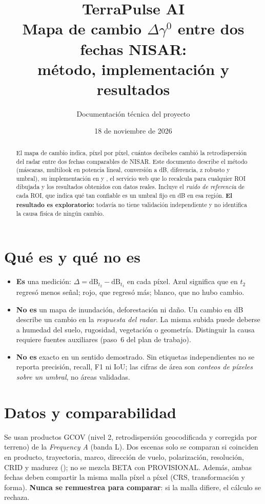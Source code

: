 \documentclass[11pt,a4paper]{article}
\title{TerraPulse AI\\[2pt]\large Mapa de cambio $\Delta\gamma^0$ entre dos fechas NISAR:\\ método, implementación y resultados}
\author{Documentación técnica del proyecto}
\date{18 de noviembre de 2026}
\begin{document}
\maketitle

\begin{abstract}
El mapa de cambio indica, píxel por píxel, cuántos decibeles cambió la retrodispersión del radar
entre dos fechas comparables de NISAR. Este documento describe el método (máscaras, multilook en
potencia lineal, conversión a dB, diferencia, z robusto y umbral), su implementación en
 y , el servicio web que lo recalcula para
cualquier ROI dibujada y los resultados obtenidos con datos reales. Incluye el \emph{ruido de
referencia} de cada ROI, que indica qué tan confiable es un umbral fijo en dB en esa región.
\textbf{El resultado es exploratorio:} todavía no tiene validación independiente y no identifica
la causa física de ningún cambio.
\end{abstract}

\section{Qué es y qué no es}

\begin{itemize}
  \item \textbf{Es} una medición: $\Delta = \text{dB}_{t_2} - \text{dB}_{t_1}$ en cada píxel. Azul
        significa que en $t_2$ regresó menos señal; rojo, que regresó más; blanco, que no hubo cambio.
  \item \textbf{No es} un mapa de inundación, deforestación ni daño. Un cambio en dB describe un
        cambio en la \emph{respuesta del radar}. La misma subida puede deberse a humedad del suelo,
        rugosidad, vegetación o geometría. Distinguir la causa requiere fuentes auxiliares
        (paso~6 del plan de trabajo).
  \item \textbf{No es} exacto en un sentido demostrado. Sin etiquetas independientes no se reporta
        precisión, recall, F1 ni IoU; las cifras de área son \emph{conteos de píxeles sobre un
        umbral}, no áreas validadas.
\end{itemize}

\section{Datos y comparabilidad}

Se usan productos GCOV (nivel 2, retrodispersión geocodificada y corregida por terreno) de la
\emph{Frequency A} (banda L). Dos escenas solo se comparan si coinciden en producto, trayectoria,
marco, dirección de vuelo, polarización, resolución, CRID y madurez (); no
se mezcla BETA con PROVISIONAL. Además, ambas fechas deben compartir la misma malla píxel a píxel
(CRS, transformación y forma). \textbf{Nunca se remuestrea para comparar}: si la malla difiere, el
cálculo se rechaza.
\end{document}
